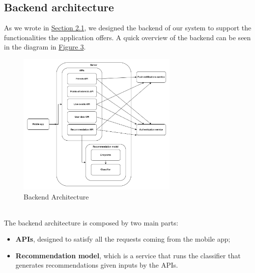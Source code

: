 \documentclass[../../main]{subfiles}
\begin{document}
\subsection{Backend architecture}
\label{ss:backend-architecture}

As we wrote in \hyperref[ss:overall-system-architecture]{Section 2.1}, we designed the backend of our system to support the functionalities the application offers.
A quick overview of the backend can be seen in the diagram in \hyperref[fig:backend_architecture]{Figure 3}.
\begin{figure}[h]
    \centering
    \includegraphics[width=0.7\textwidth]{images/backend_architecture}
    \caption{Backend Architecture}\label{fig:backend_architecture}
\end{figure}\\
\noindent
The backend architecture is composed by two main parts:
\begin{itemize}
    \item \textbf{APIs}, designed to satisfy all the requests coming from the mobile app;
    \item \textbf{Recommendation model}, which is a service that runs the classifier that generates recommendations given inputs by the APIs.
\end{itemize}

\label{sss:apis}
\end{document}
